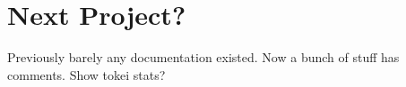 % 

\section{Next Project?}

\begin{frame}[c]
    Previously barely any documentation existed. Now a bunch of stuff has comments.
    Show tokei stats?
\end{frame}

